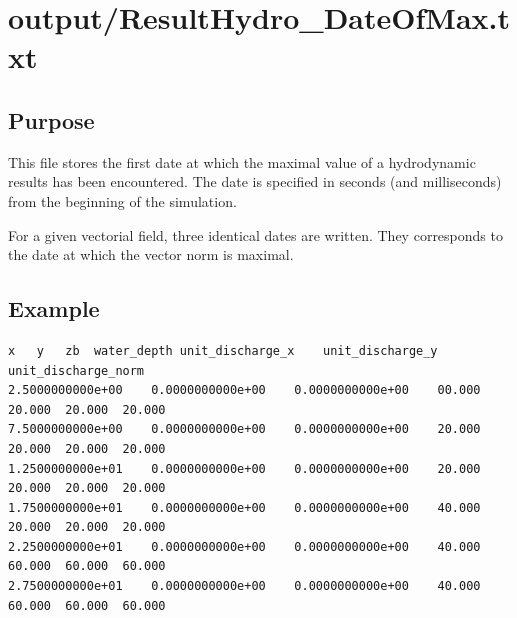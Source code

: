 \section{output/ResultHydro\_DateOfMax.txt}

\subsection{Purpose}
This file stores the first date at which the maximal value of a hydrodynamic results has been encountered. The date is specified in seconds (and milliseconds) from the beginning of the simulation.


For a given vectorial field, three identical dates are written. They corresponds to the date at which the vector norm is maximal.


\subsection{Example}
\begin{verbatim}
x	y	zb	water_depth	unit_discharge_x	unit_discharge_y	unit_discharge_norm
2.5000000000e+00	0.0000000000e+00	0.0000000000e+00	00.000	20.000	20.000	20.000
7.5000000000e+00	0.0000000000e+00	0.0000000000e+00	20.000	20.000	20.000	20.000
1.2500000000e+01	0.0000000000e+00	0.0000000000e+00	20.000	20.000	20.000	20.000
1.7500000000e+01	0.0000000000e+00	0.0000000000e+00	40.000	20.000	20.000	20.000
2.2500000000e+01	0.0000000000e+00	0.0000000000e+00	40.000	60.000	60.000	60.000
2.7500000000e+01	0.0000000000e+00	0.0000000000e+00	40.000	60.000	60.000	60.000
\end{verbatim}